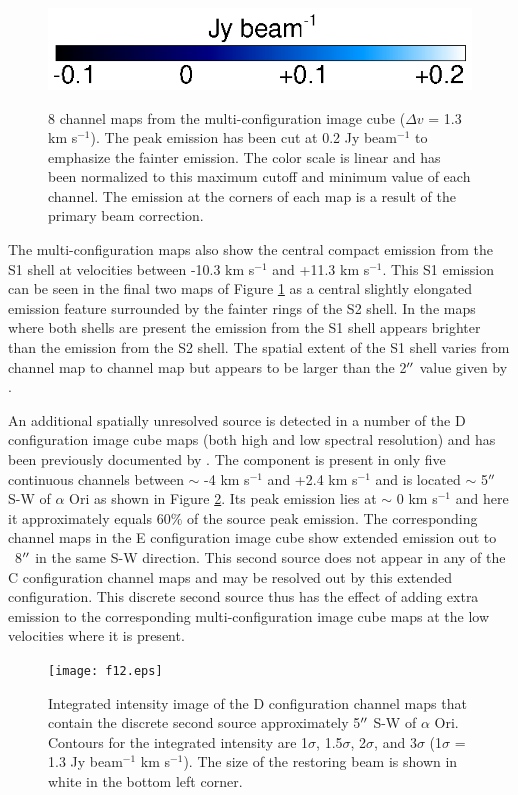 \documentclass[iop]{emulateapj}
\begin{document}
\begin{figure}[hbt!]
{         }
\includegraphics[trim=0pt 20pt 0pt 5pt]{f11.ps}
\caption{8 channel maps from the multi-configuration image cube ($\Delta v$ = 1.3 km s${}^{-1}$). The peak emission has been cut at 0.2 Jy beam${{}^{-1}}$ to emphasize the fainter emission. The color scale is linear and has been normalized to this maximum cutoff and minimum value of each channel. The emission at the corners of each map is a result of the primary beam correction.}
\label{fig:fig3}
\end{figure}

The multi-configuration maps also show the central compact emission from the S1 shell at velocities between -10.3 km s${}^{-1}$ and +11.3 km s${}^{-1}$. This S1 emission can be seen in the final two maps of Figure \ref{fig:fig3} as a central slightly elongated emission feature surrounded by the fainter rings of the S2 shell. In the maps where both shells are present the emission from the S1 shell appears brighter than the emission from the S2 shell. The spatial extent of the S1 shell varies from channel map to channel map but appears to be larger than the 2$\mbox{$^{\prime\prime}$}$ value given by \cite{2009AJ....137.3558S}. 

An additional spatially unresolved source is detected in a number of the D configuration image cube maps (both high and low spectral resolution) and has been previously documented by \citet{2009AIPC.1094..868H}. The component is present in only five continuous channels between $\sim$ -4 km s${}^{-1}$ and +2.4 km s${}^{-1}$ and is located $\sim$ 5$\mbox{$^{\prime\prime}$}$ S-W of $\alpha$ Ori as shown in Figure \ref{fig:fig4}. Its peak emission lies at $\sim$ 0 km s${}^{-1}$ and here it approximately equals 60$\%$ of the source peak emission. The corresponding channel maps in the E configuration image cube show extended emission out to ~8$\mbox{$^{\prime\prime}$}$ in the same S-W direction. This second source does not appear in any of the C configuration channel maps and may be resolved out by this extended configuration. This discrete second source thus has the effect of adding extra emission to the corresponding multi-configuration image cube maps at the low velocities where it is present.

\begin{figure}
\texttt{[image: f12.eps]}
\caption{Integrated intensity image of the D configuration channel maps that contain the discrete second source approximately 5$\mbox{$^{\prime\prime}$}$ S-W of $\alpha$ Ori. Contours for the integrated intensity are 1$\sigma$, 1.5$\sigma$, 2$\sigma$, and 3$\sigma$ (1$\sigma$ = 1.3 Jy beam${}^{-1}$ km s${}^{-1}$). The size of the restoring beam is shown in white in the bottom left corner.}
\label{fig:fig4}
\end{figure}
\end{document}
